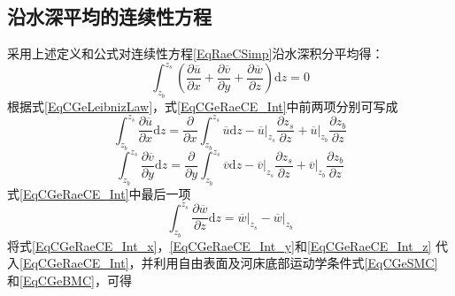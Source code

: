 \subsection{沿水深平均的连续性方程}
采用上述定义和公式对连续性方程\eqref{EqRaeCSimp}沿水深积分平均得：
\begin{equation}
  \int_{z_{b}}^{ z_{s}}\!
  \left(
  \frac{\partial \overline{u}}{\partial x} +
  \frac{\partial \overline{v}}{\partial y} +
  \frac{\partial \overline{w}}{\partial z}
  \right)
  \mathrm{d}z
  =
  0
  \label{EqCGeRaeCE_Int}
\end{equation}
根据式\eqref{EqCGeLeibnizLaw}，式\eqref{EqCGeRaeCE_Int}中前两项分别可写成
\begin{equation}
  \int_{z_{b}}^{ z_{s}}\!
  \frac{\partial \overline{u}}{\partial x}
  \mathrm{d}z
  =
  \frac{\partial}{\partial x}
  \int_{z_{b}}^{ z_{s}}\!
  \overline{u}
  \mathrm{d}z
  -
  \left.\overline{u}\right|_{z_{s}}
  \frac{\partial z_{s}}{\partial z}
  +
  \left.\overline{u}\right|_{z_{b}}
  \frac{\partial z_{b}}{\partial z}
  \label{EqCGeRaeCE_Int_x}
\end{equation}
\begin{equation}
  \int_{z_{b}}^{ z_{s}}\!
  \frac{\partial \overline{v}}{\partial y}
  \mathrm{d}z
  =
  \frac{\partial}{\partial y}
  \int_{z_{b}}^{ z_{s}}\!
  \overline{v}
  \mathrm{d}z
  -
  \left.\overline{v}\right|_{z_{s}}
  \frac{\partial z_{s}}{\partial z}
  +
  \left.\overline{v}\right|_{z_{b}}
  \frac{\partial z_{b}}{\partial z}
  \label{EqCGeRaeCE_Int_y}
\end{equation}
式\eqref{EqCGeRaeCE_Int}中最后一项
\begin{equation}
  \int_{z_{b}}^{ z_{s}}\!
  \frac{\partial \overline{w}}{\partial z}
  \mathrm{d}z
  =
  \left.\overline{w}\right|_{z_{s}}
  -
  \left.\overline{w}\right|_{z_{b}}
  \label{EqCGeRaeCE_Int_z}
\end{equation}
将式\eqref{EqCGeRaeCE_Int_x}，\eqref{EqCGeRaeCE_Int_y}和\eqref{EqCGeRaeCE_Int_z}
代入\eqref{EqCGeRaeCE_Int}，并利用自由表面及河床底部运动学条件式\eqref{EqCGeSMC}
和\eqref{EqCGeBMC}，可得
